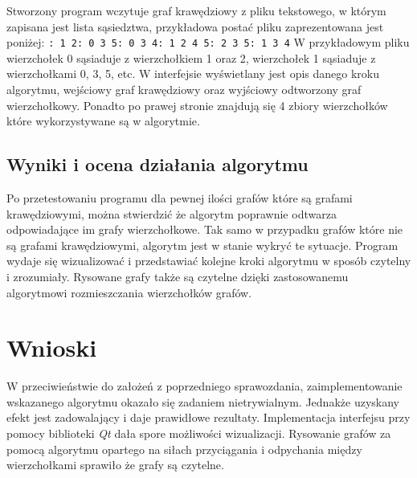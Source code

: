 \documentclass{article}
\begin{document}
Stworzony program wczytuje graf krawędziowy z pliku tekstowego, w którym zapisana jest lista sąsiedztwa, przykładowa postać pliku zaprezentowana jest poniżej:
\texttt{: 1 2: 0 3 5: 0 3 4: 1 2 4 5: 2 3 5: 1 3 4\newline}
W przykładowym pliku wierzchołek 0 sąsiaduje z wierzchołkiem 1 oraz 2, wierzchołek 1 sąsiaduje z wierzchołkami 0, 3, 5, etc.
W interfejsie wyświetlany jest opis danego kroku algorytmu, wejściowy graf krawędziowy oraz wyjściowy odtworzony graf wierzchołkowy. Ponadto po prawej stronie znajdują się 4 zbiory wierzchołków które wykorzystywane są w algorytmie.

\subsection{Wyniki i ocena działania algorytmu}
Po przetestowaniu programu dla pewnej ilości grafów które są grafami krawędziowymi, można stwierdzić że algorytm poprawnie odtwarza odpowiadające im grafy wierzchołkowe. Tak samo w przypadku grafów które nie są grafami krawędziowymi, algorytm jest w stanie wykryć te sytuacje. Program wydaje się wizualizować i przedstawiać kolejne kroki algorytmu w sposób czytelny i zrozumiały. Rysowane grafy także są czytelne dzięki zastosowanemu algorytmowi rozmieszczania wierzchołków grafów\cite{force}.

\section{Wnioski}
W przeciwieństwie do założeń z poprzedniego sprawozdania, zaimplementowanie wskazanego algorytmu okazało się zadaniem nietrywialnym. Jednakże uzyskany efekt jest zadowalający i daje prawidłowe rezultaty. Implementacja interfejsu przy pomocy biblioteki \textit{Qt} dała spore możliwości wizualizacji. Rysowanie grafów za pomocą algorytmu opartego na siłach przyciągania i odpychania między wierzchołkami sprawiło że grafy są czytelne.

 

\end{document}
